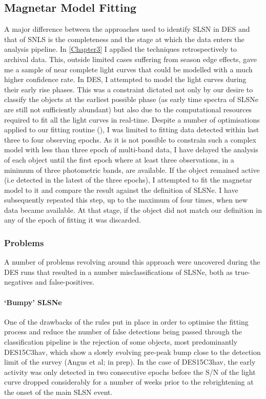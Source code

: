\subsection{Magnetar Model Fitting}
A major difference between the approaches used to identify SLSN in DES and that of SNLS is the completeness and the stage at which the data enters the analysis pipeline. In \cref{Chapter3} I applied the techniques retrospectively to archival data. This, outside limited cases suffering from season edge effects, gave me a sample of near complete light curves that could be modelled with a much higher confidence rate. In DES, I attempted to model the light curves during their early rise phases. This was a constraint dictated not only by our desire to classify the objects at the earliest possible phase (as early time spectra of SLSNe are still not sufficiently abundant) but also due to the computational resources required to fit all the light curves in real-time. Despite a number of optimisations applied to our fitting routine (), I was limited to fitting data detected within last three to four observing epochs. As it is not possible to constrain such a complex model with less than three epoch of multi-band data, I have delayed the analysis of each object until the first epoch where at least three observations, in a minimum of three photometric bands, are available. If the object remained active (i.e detected in the latest of the three epochs), I attempted to fit the magnetar model to it and compare the result against the definition of SLSNe. I have subsequently repeated this step, up to the maximum of four times, when new data became available. At that stage, if the object did not match our definition in any of the epoch of fitting it was discarded.

\subsubsection{Problems}
A number of problems revolving around this approach were uncovered during the DES runs that resulted in a number misclassifications of SLSNe, both as true-negatives and false-positives.

\paragraph{`Bumpy' SLSNe}
One of the drawbacks of the rules put in place in order to optimise the fitting process and reduce the number of false detections being passed through the classification pipeline is the rejection of some objects, most predominantly DES15C3hav, which show a slowly evolving pre-peak bump close to the detection limit of the survey (Angus et al; in prep). In the case of DES15C3hav, the early activity was only detected in two consecutive epochs before the S/N of the light curve dropped considerably for a number of weeks prior to the rebrightening at the onset of the main SLSN event.

